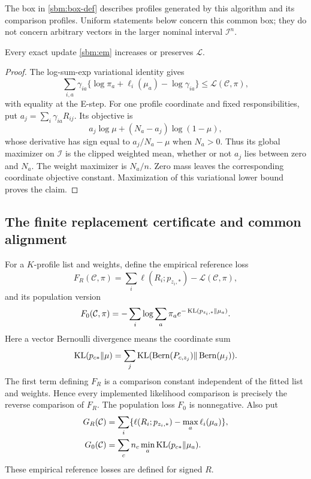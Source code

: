 The box in \eqref{sbm:box-def} describes profiles generated by this
algorithm and its comparison profiles. Uniform statements below concern
this common box; they do not concern arbitrary vectors in the larger
nominal interval $\mathcal I^n$.

\begin{lemma}
\label{sbm:em-monotonicity}
Every exact update \eqref{sbm:em} increases or preserves $\mathcal L$.
\end{lemma}

\begin{proof}
The log-sum-exp variational identity gives
\[
 \sum_{i,a}\gamma_{ia}
 \{\log\pi_a+\ell_i(\mu_a)-\log\gamma_{ia}\}
 \le\mathcal L(\mathcal C,\pi),
\]
with equality at the E-step. For one profile coordinate and fixed
responsibilities, put $a_j=\sum_i\gamma_{ia}R_{ij}$. Its objective is
\[
 a_j\log\mu+(N_a-a_j)\log(1-\mu),
\]
whose derivative has sign equal to $a_j/N_a-\mu$ when $N_a>0$.
Thus its global maximizer on $\mathcal I$ is the clipped weighted mean,
whether or not $a_j$ lies between zero and $N_a$. The weight maximizer
is $N_a/n$. Zero mass leaves the corresponding coordinate objective
constant. Maximization of this variational lower bound proves the claim.
\end{proof}

\subsection{The finite replacement certificate and common alignment}
\label{sbm:initialization-section}

For a $K$-profile list and weights, define the empirical reference loss
\[
 F_R(\mathcal C,\pi)
 =\sum_i\ell(R_i;p_{z_i,*})-\mathcal L(\mathcal C,\pi),
\]
and its population version
\[
 F_0(\mathcal C,\pi)
 =-\sum_i\log\sum_a\pi_a
                   e^{-\operatorname{KL}(p_{z_i,*}\Vert\mu_a)}.
\]
Here a vector Bernoulli divergence means the coordinate sum
\[
 \operatorname{KL}(p_{c*}\Vert\mu)=\sum_j
 \operatorname{KL}(\operatorname{Bern}(P_{c,z_j})\Vert\operatorname{Bern}(\mu_j)).
\]
The first term defining $F_R$ is a comparison constant independent of
the fitted list and weights. Hence every implemented likelihood
comparison is precisely the reverse comparison of $F_R$. The population
loss $F_0$ is nonnegative. Also put
\begin{align*}
 G_R(\mathcal C)
 &=\sum_i\{\ell(R_i;p_{z_i,*})-\max_a\ell_i(\mu_a)\},\\
 G_0(\mathcal C)
 &=\sum_c n_c\min_a\operatorname{KL}(p_{c*}\Vert\mu_a).
\end{align*}
These empirical reference losses are defined for signed $R$.

